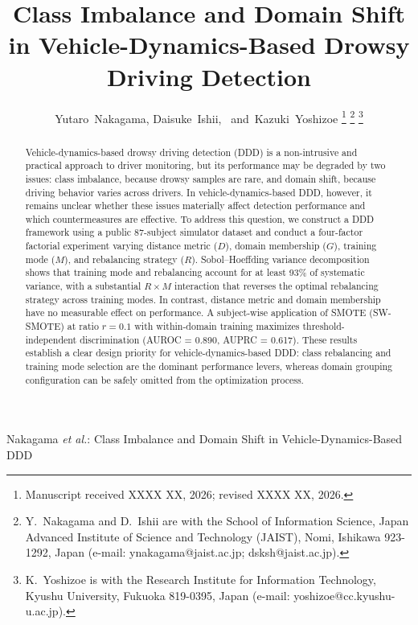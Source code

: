 \documentclass[lettersize,journal]{IEEEtran}
\begin{document}
\title{Class Imbalance and Domain Shift in Vehicle-Dynamics-Based Drowsy Driving Detection}

\author{Yutaro~Nakagama,
Daisuke~Ishii,~ and~Kazuki~Yoshizoe
\thanks{Manuscript received XXXX XX, 2026; revised XXXX XX, 2026.}%
\thanks{Y.~Nakagama and D.~Ishii are with the School of Information Science, Japan Advanced Institute of Science and Technology (JAIST), Nomi, Ishikawa 923-1292, Japan (e-mail: ynakagama@jaist.ac.jp; dsksh@jaist.ac.jp).}%
\thanks{K.~Yoshizoe is with the Research Institute for Information Technology, Kyushu University, Fukuoka 819-0395, Japan (e-mail: yoshizoe@cc.kyushu-u.ac.jp).}}

%
{Nakagama \MakeLowercase{\textit{et al.}}: Class Imbalance and Domain Shift in Vehicle-Dynamics-Based DDD}

\maketitle

\begin{abstract}
Vehicle-dynamics-based drowsy driving detection (DDD) is a non-intrusive and practical approach to driver monitoring, but its performance may be degraded by two issues: class imbalance, because drowsy samples are rare, and domain shift, because driving behavior varies across drivers.
In vehicle-dynamics-based DDD, however, it remains unclear whether these issues materially affect detection performance and which countermeasures are effective.
To address this question, we construct a DDD framework using a public 87-subject simulator dataset and conduct a four-factor factorial experiment varying distance metric ($D$), domain membership ($G$), training mode ($M$), and rebalancing strategy ($R$).
Sobol--Hoeffding variance decomposition shows that training mode and rebalancing account for at least 93\% of systematic variance, with a substantial $R \times M$ interaction that reverses the optimal rebalancing strategy across training modes.
In contrast, distance metric and domain membership have no measurable effect on performance.
A subject-wise application of SMOTE (SW-SMOTE) at ratio $r = 0.1$ with within-domain training maximizes threshold-independent discrimination (AUROC = 0.890, AUPRC = 0.617).
These results establish a clear design priority for vehicle-dynamics-based DDD: class rebalancing and training mode selection are the dominant performance levers, whereas domain grouping configuration can be safely omitted from the optimization process.
\end{abstract}
\end{document}
